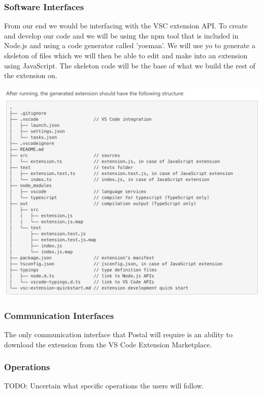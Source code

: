 \documentclass[letterpaper,10pt,titlepage,draftclsnofoot,onecolumn,onesided] {IEEEtran}
\begin{document}
\subsubsection{Software Interfaces}
From our end we would be interfacing with the VSC extension API. To create and develop our code and we will be using the npm tool that is included in Node.js and using a code generator called 'yoeman'. We will use yo to generate a skeleton of files which we will then be able to edit and make into an extension using JavaScript. The skeleton code will be the base of what we build the rest of the extension on. 

\includegraphics[scale=0.5]{fileStructure.png}
\subsubsection{Communication Interfaces}
The only communication interface that Postal will require is an ability to download the extension from the VS Code Extension Marketplace. 

\subsubsection{Operations}
TODO: Uncertain what specific operations the users will follow.
\end{document}

